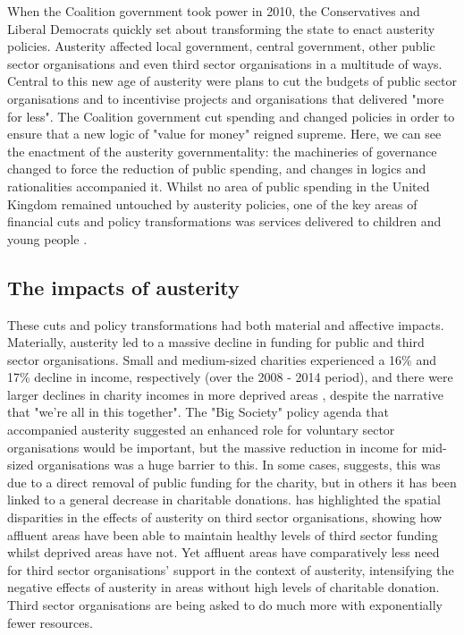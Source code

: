 When the Coalition government took power in 2010, the Conservatives and Liberal Democrats quickly set about transforming the state to enact austerity policies. Austerity affected local government, central government, other public sector organisations and even third sector organisations in a multitude of ways. Central to this new age of austerity were plans to cut the budgets of public sector organisations and to incentivise projects and organisations that delivered "more for less". The Coalition government cut spending and changed policies in order to ensure that a new logic of "value for money" reigned supreme.  Here, we can see the enactment of the austerity governmentality: the machineries of governance changed to force the reduction of public spending, and changes in logics and rationalities accompanied it. Whilst no area of public spending in the United Kingdom remained untouched by austerity policies, one of the key areas of financial cuts and policy transformations was services delivered to children and young people \citep{youdell_assembling_2015}.

\subsection{The impacts of austerity}
\label{subsec:the-impacts-of-austerity}

These cuts and policy transformations had both material and affective impacts. Materially, austerity led to a massive decline in funding for public and third sector organisations. Small and medium-sized charities experienced a 16\% and 17\% decline in income, respectively (over the 2008 - 2014 period), and there were larger declines in charity incomes in more deprived areas \citep{clifford_charitable_2017}, despite the narrative that "we're all in this together". The "Big Society" policy agenda that accompanied austerity suggested an enhanced role for voluntary sector organisations would be important, but the massive reduction in income for mid-sized organisations was a huge barrier to this. In some cases, \citet{clifford_charitable_2017} suggests, this was due to a direct removal of public funding for the charity, but in others it has been linked to a general decrease in charitable donations. \citet{jones_uneven_2016} has highlighted the spatial disparities in the effects of austerity on third sector organisations, showing how affluent areas have been able to maintain healthy levels of third sector funding whilst deprived areas have not. Yet affluent areas have comparatively less need for third sector organisations' support in the context of austerity, intensifying the negative effects of austerity in areas without high levels of charitable donation. Third sector organisations are being asked to do much more with exponentially fewer resources.

